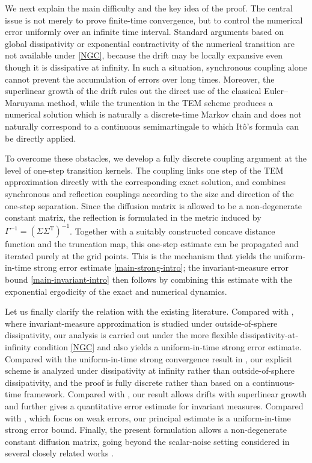 \documentclass[aap]{imsart}
\theoremstyle{plain}
\theoremstyle{definition}
\begin{document}
We next explain the main difficulty and the key idea of the proof. The central issue is not merely to prove finite-time convergence, but to control the numerical error uniformly over an infinite time interval. Standard arguments based on global dissipativity or exponential contractivity of the numerical transition are not available under \eqref{NGC}, because the drift may be locally expansive even though it is dissipative at infinity. In such a situation, synchronous coupling alone cannot prevent the accumulation of errors over long times. Moreover, the superlinear growth of the drift rules out the direct use of the classical Euler--Maruyama method, while the truncation in the TEM scheme produces a numerical solution which is naturally a discrete-time Markov chain and does not naturally correspond to a continuous semimartingale to which It\^o's formula can be directly applied.

To overcome these obstacles, we develop a fully discrete coupling argument at the level of one-step transition kernels. The coupling links one step of the TEM approximation directly with the corresponding exact solution, and combines synchronous and reflection couplings according to the size and direction of the one-step separation. Since the diffusion matrix is allowed to be a non-degenerate constant matrix, the reflection is formulated in the metric induced by \(\Gamma^{-1}=(\Sigma\Sigma^{\mathrm T})^{-1}\). Together with a suitably constructed concave distance function and the truncation map, this one-step estimate can be propagated and iterated purely at the grid points. This is the mechanism that yields the uniform-in-time strong error estimate \eqref{main-strong-intro}; the invariant-measure error bound \eqref{main-invariant-intro} then follows by combining this estimate with the exponential ergodicity of the exact and numerical dynamics.

Let us finally clarify the relation with the existing literature. Compared with \cite{Bao, Bao2, A.D. N}, where invariant-measure approximation is studied under outside-of-sphere dissipativity, our analysis is carried out under the more flexible dissipativity-at-infinity condition \eqref{NGC} and also yields a uniform-in-time strong error estimate. Compared with the uniform-in-time strong convergence result in \cite{Bao1}, our explicit scheme is analyzed under dissipativity at infinity rather than outside-of-sphere dissipativity, and the proof is fully discrete rather than based on a continuous-time framework. Compared with \cite{Majka}, our result allows drifts with superlinear growth and further gives a quantitative error estimate for invariant measures. Compared with \cite{P.C, L.ZH}, which focus on weak errors, our principal estimate is a uniform-in-time strong error bound. Finally, the present formulation allows a non-degenerate constant diffusion matrix, going beyond the scalar-noise setting considered in several closely related works \cite{Bao, Bao1, Bao2, 2025SPA, Majka, A.D. N}.
\end{document}

